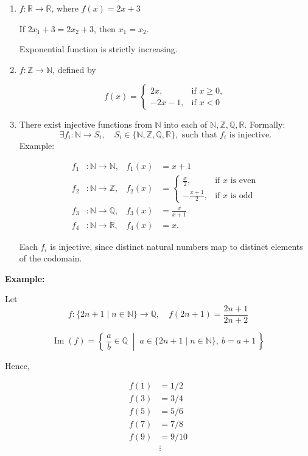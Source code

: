 \documentclass[12pt,a4paper,openany]{article}
\begin{document}
\begin{enumerate}
\item $f : \mathbb{R} \to \mathbb{R}$, where $f(x) = 2x + 3$

   If $2x_1 + 3 = 2x_2 + 3$, then $x_1 = x_2$.

   Exponential function is strictly increasing.

\item $f : \mathbb{Z} \to \mathbb{N}$, defined by

   \[
   f(x) =
   \begin{cases}
   2x, & \text{if } x \ge 0, \\
   -2x - 1, & \text{if } x < 0
   \end{cases}
   \]

\item There exist injective functions from $\mathbb{N}$ into each of $\mathbb{N}, \mathbb{Z}, \mathbb{Q}, \mathbb{R}$.
   Formally:
   \[
   \exists f_i : \mathbb{N} \to S_i, \quad S_i \in \{\mathbb{N}, \mathbb{Z}, \mathbb{Q}, \mathbb{R}\}, \text{ such that } f_i \text{ is injective.}
   \]
   Example:

    \[
    \begin{aligned}
    f_1 &: \mathbb{N} \to \mathbb{N}, & f_1(x) &= x + 1 \\
    f_2 &: \mathbb{N} \to \mathbb{Z}, & 
    f_2(x) &=
    \begin{cases}
    \frac{x}{2}, & \text{if } x \text{ is even} \\[0.5em]
    -\frac{x+1}{2}, & \text{if } x \text{ is odd}
    \end{cases} \\
    f_3 &: \mathbb{N} \to \mathbb{Q}, & f_3(x) &= \frac{x}{x+1} \\
    f_4 &: \mathbb{N} \to \mathbb{R}, & f_4(x) &= x.
    \end{aligned}
    \]

    Each $f_i$ is injective, since distinct natural numbers map to distinct elements of the codomain.
\end{enumerate}


\textbf{Example:}

Let  \[f: \{2n+1 \mid n \in \mathbb{N}\} \longrightarrow \mathbb{Q}, \quad f(2n+1) = \frac{2n+1}{2n+2}\]

\[\operatorname{Im}(f) = \left\{\, \frac{a}{b} \in \mathbb{Q} \;\middle|\; a \in \{2n+1 \mid n \in \mathbb{N}\},\ b = a+1 \,\right\}\]

Hence,

\[
\begin{aligned}
f(1) &= 1/2 \\
f(3) &= 3/4 \\
f(5) &= 5/6 \\
f(7) &= 7/8 \\
f(9) &= 9/10 \\
&\vdots
\end{aligned}
\]
\end{document}
